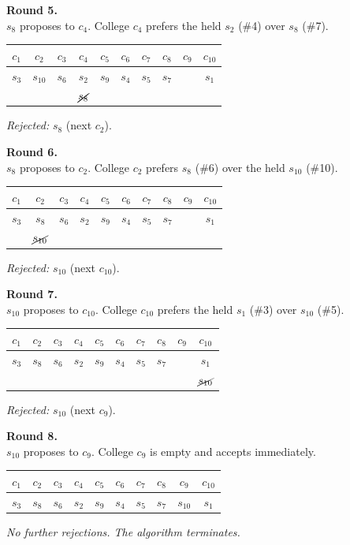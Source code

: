 {\medskip
\noindent\textbf{Round 5.} \\
$s_8$ proposes to $c_4$. College $c_4$ prefers the held $s_2$ (\#4) over $s_8$ (\#7).
\begin{center}
\renewcommand{\arraystretch}{1.2}
\begin{tabular}{cccccccccc}
    $c_1$ & $c_2$ & $c_3$ & $c_4$ & $c_5$ & $c_6$ & $c_7$ & $c_8$ & $c_9$ & $c_{10}$ \\
    \hline
    $s_3$ & $s_{10}$ & $s_6$ & $s_2$ & $s_9$ & $s_4$ & $s_5$ & $s_7$ & & $s_1$ \\
     & & & $\cancel{s_8}$ & & & & & & \\
\end{tabular}
\end{center}
\textit{Rejected:} $s_8$ (next $c_2$).

\medskip
\noindent\textbf{Round 6.} \\
$s_8$ proposes to $c_2$. College $c_2$ prefers $s_8$ (\#6) over the held $s_{10}$ (\#10).
\begin{center}
\renewcommand{\arraystretch}{1.2}
\begin{tabular}{cccccccccc}
    $c_1$ & $c_2$ & $c_3$ & $c_4$ & $c_5$ & $c_6$ & $c_7$ & $c_8$ & $c_9$ & $c_{10}$ \\
    \hline
    $s_3$ & $s_8$ & $s_6$ & $s_2$ & $s_9$ & $s_4$ & $s_5$ & $s_7$ & & $s_1$ \\
     & $\cancel{s_{10}}$ & & & & & & & & \\
\end{tabular}
\end{center}
\textit{Rejected:} $s_{10}$ (next $c_{10}$).

\medskip
\noindent\textbf{Round 7.} \\
$s_{10}$ proposes to $c_{10}$. College $c_{10}$ prefers the held $s_1$ (\#3) over $s_{10}$ (\#5).
\begin{center}
\renewcommand{\arraystretch}{1.2}
\begin{tabular}{cccccccccc}
    $c_1$ & $c_2$ & $c_3$ & $c_4$ & $c_5$ & $c_6$ & $c_7$ & $c_8$ & $c_9$ & $c_{10}$ \\
    \hline
    $s_3$ & $s_8$ & $s_6$ & $s_2$ & $s_9$ & $s_4$ & $s_5$ & $s_7$ & & $s_1$ \\
     & & & & & & & & & $\cancel{s_{10}}$ \\
\end{tabular}
\end{center}
\textit{Rejected:} $s_{10}$ (next $c_9$).

\medskip
\noindent\textbf{Round 8.} \\
$s_{10}$ proposes to $c_9$. College $c_9$ is empty and accepts immediately.
\begin{center}
\renewcommand{\arraystretch}{1.2}
\begin{tabular}{cccccccccc}
    $c_1$ & $c_2$ & $c_3$ & $c_4$ & $c_5$ & $c_6$ & $c_7$ & $c_8$ & $c_9$ & $c_{10}$ \\
    \hline
    $s_3$ & $s_8$ & $s_6$ & $s_2$ & $s_9$ & $s_4$ & $s_5$ & $s_7$ & $s_{10}$ & $s_1$ \\
\end{tabular}
\end{center}
\textit{No further rejections. The algorithm terminates.}

}

